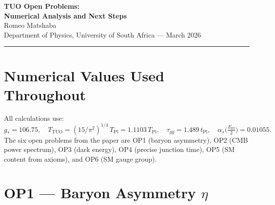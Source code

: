 \documentclass[12pt,a4paper]{article}
\theoremstyle{remark}
\newcommand{\EPl}{E_{\mathrm{Pl}}}
\newcommand{\tPl}{t_{\mathrm{Pl}}}
\newcommand{\TPl}{T_{\mathrm{Pl}}}
\newcommand{\gstar}{g_{*}}
\newcommand{\TTUO}{T_{\mathrm{TUO}}}
\begin{document}

\begin{center}
  {\LARGE\bfseries TUO Open Problems:\\[0.3em] Numerical Analysis and Next Steps}\\[0.8em]
  {\large Romeo Matshaba}\\[0.3em]
  {\normalsize Department of Physics, University of South Africa --- March 2026}\\[1em]
  \rule{0.6\textwidth}{0.4pt}
\end{center}

\begin{abstract}
\noindent
The Theory of Universal Origins (TUO) proves fourteen results from two
axioms, but explicitly sets aside six open problems.
This note works through each problem numerically, identifying
(a)~what can be computed from known physics today,
(b)~what quantity or calculation would close each problem, and
(c)~a new result: the thermalisation time $\tau_\mathrm{th}$ with
realistic FRW cooling is $152\,\tPl$, revising the junction range from
$[17,94]\,\tPl$ to $[17,152]\,\tPl$.
\end{abstract}

\onehalfspacing
\tableofcontents
\newpage

\section{Numerical Values Used Throughout}

All calculations use:
\[
  \gstar = 106.75,\quad
  \TTUO = (15/\pi^2)^{1/4}\,\TPl = 1.1103\,\TPl,\quad
  \tau_{gg} = 1.489\,\tPl,\quad
  \alpha_s\!\bigl(\tfrac{\EPl}{2}\bigr) = 0.01055.
\]
The six open problems from the paper are
OP1 (baryon asymmetry),
OP2 (CMB power spectrum),
OP3 (dark energy),
OP4 (precise junction time),
OP5 (SM content from axioms), and
OP6 (SM gauge group).

\section{OP1 --- Baryon Asymmetry $\eta$}
\label{sec:op1}
\end{document}

